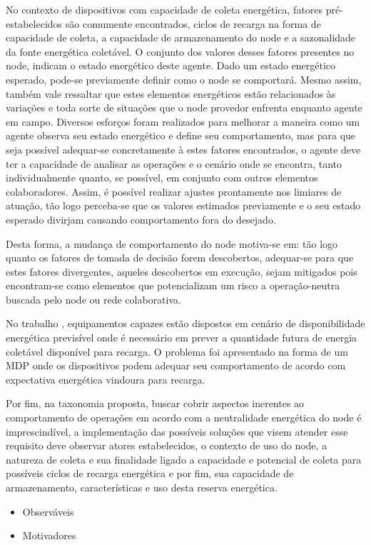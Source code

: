 No contexto de dispositivos com capacidade de coleta energética, fatores pré-estabelecidos são comumente encontrados, ciclos de recarga na forma de capacidade de coleta, a capacidade de armazenamento do node e a sazonalidade da fonte energética coletável. O conjunto dos valores  desses fatores presentes no node, indicam o estado energético deste agente. Dado um estado energético esperado, pode-se previamente definir como o node se comportará. Mesmo assim, também vale ressaltar que estes elementos energéticos estão relacionados às variações e toda sorte de situações que o node provedor enfrenta enquanto agente em campo. Diversos esforços foram realizados para melhorar a maneira como um agente observa seu estado energético e define seu comportamento, mas para que seja possível adequar-se concretamente à estes fatores encontrados, o agente deve ter a capacidade de analisar as operações e o cenário onde se encontra, tanto individualmente quanto, se possível, em conjunto com outros elementos colaboradores. Assim, é possível realizar ajustes prontamente nos limiares de atuação, tão logo perceba-se que os valores estimados previamente e o seu estado esperado divirjam causando comportamento fora do desejado.

Desta forma, a mudança de comportamento do node motiva-se em: tão logo quanto os fatores de tomada de decisão forem descobertos, adequar-se para que estes fatores divergentes, aqueles descobertos em execução, sejam mitigados pois encontram-se como elementos que potencializam um risco a operação-neutra buscada pelo node ou rede colaborativa. 

No trabalho \cite{zhang_toward_2018}, equipamentos capazes estão dispostos em cenário de disponibilidade energética previsível onde é necessário em prever a quantidade futura de energia coletável disponível para recarga. O problema foi apresentado na forma de um \ac{MDP} onde os dispositivos podem adequar seu comportamento de acordo com expectativa energética vindoura para recarga.  

Por fim, na taxonomia proposta, buscar cobrir aspectos inerentes ao comportamento de operações em acordo com a neutralidade energética do node é imprescindível, a implementação das possíveis soluções que visem atender esse requisito deve observar atores estabelecidos, o contexto de uso do node, a natureza de coleta e sua finalidade ligado a capacidade e potencial de coleta para possíveis ciclos de recarga energética e por fim, sua capacidade de armazenamento, características e uso desta reserva energética.


\begin{itemize}
\item Observáveis
\item Motivadores
\end{itemize}










